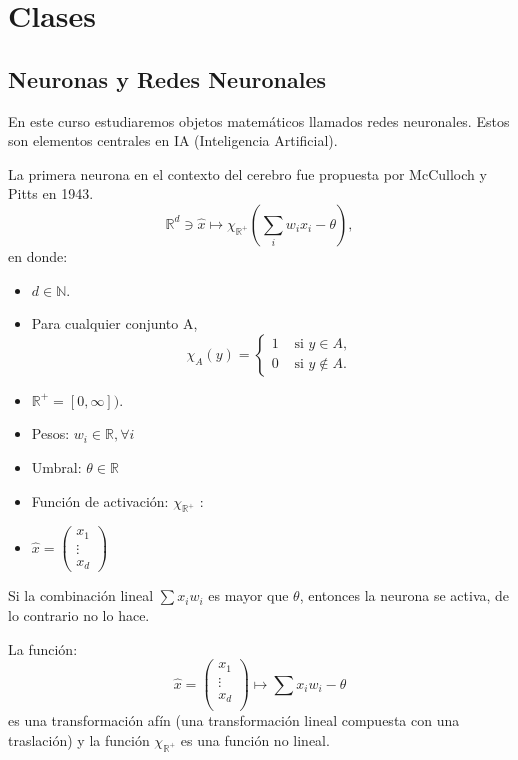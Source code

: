 \documentclass[12pt,a4paper]{book}
\begin{document}
\part{Clases}
\chapter{Neuronas y Redes Neuronales}
  
En este curso estudiaremos objetos matemáticos llamados redes neuronales. Estos son elementos centrales en IA (Inteligencia Artificial).

La primera neurona en el contexto del cerebro fue propuesta por McCulloch y Pitts en 1943.
\begin{equation}\label{eq:McCulloch-Pitts}
\mathbb{R}^{d}\ni \widehat{x}\mapsto \chi_{\mathbb{R}^{+}}\left(\sum_{i} w_{i}x_{i}-\theta\right),
\end{equation}
en donde:
\begin{itemize}
\item $d\in\mathbb{N}$.
\item Para cualquier conjunto A,
\begin{equation*}
 \chi_{A}(y)=
\begin{cases}
1 & \text{ si $y\in A$, }\\ 
0 & \text{ si $y\not\in A$. }  
\end{cases}
\end{equation*}
\item $\mathbb{R}^{+}=[0,\infty])$.
\item Pesos: $w_{i}\in\mathbb{R}, \forall i$ 
\item Umbral: $\theta\in\mathbb{R}$
\item Función de activación: $\chi_{\mathbb{R}^{+}}$ :
\item $\widehat{x}=\begin{pmatrix}
x_{1} \\ 
\vdots \\ 
x_{d}
\end{pmatrix}$
\end{itemize}
Si la combinación lineal $\sum x_{i}w_{i}$ es mayor que $\theta$, entonces la neurona se activa, de lo contrario no lo hace.

La función:
\begin{equation}
\widehat{x}=
\begin{pmatrix}
x_{1} \\ 
\vdots \\ 
x_{d} \\ 
\end{pmatrix}
\mapsto \sum x_{i}w_{i}-\theta     
\end{equation}
es una transformación afín (una transformación lineal compuesta con una traslación) y la función $\chi_{\mathbb{R}^{+}}$ es una función no lineal.
\end{document}
